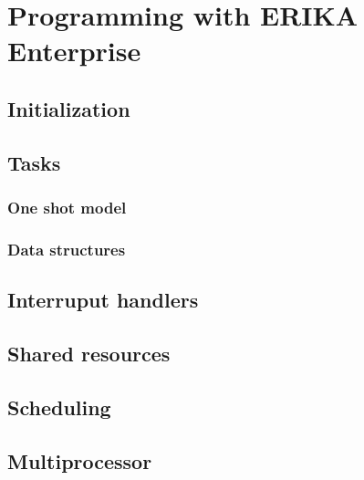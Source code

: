 \chapter[Programming]{Programming with ERIKA Enterprise}


\section{Initialization}

\section{Tasks}

\subsection{One shot model}

\subsection{Data structures}


\section{Interruput handlers}


\section{Shared resources}


\section{Scheduling}


\section{Multiprocessor}

